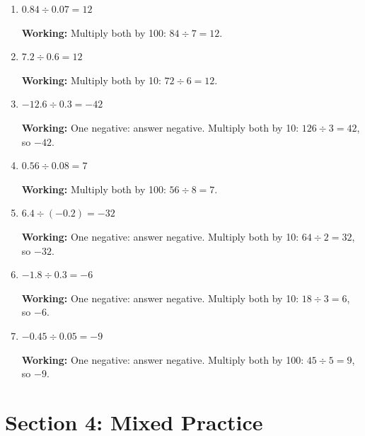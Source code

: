 \documentclass[12pt,a4paper]{article}
\begin{document}
\begin{enumerate}
    \textbf{Working:} Multiply both by 10: $36 \div 6 = 6$.
    
    \item $0.84 \div 0.07 = 12$
    
    \textbf{Working:} Multiply both by 100: $84 \div 7 = 12$.
    
    \item $7.2 \div 0.6 = 12$
    
    \textbf{Working:} Multiply both by 10: $72 \div 6 = 12$.
    
    \item $-12.6 \div 0.3 = -42$
    
    \textbf{Working:} One negative: answer negative.
    Multiply both by 10: $126 \div 3 = 42$, so $-42$.
    
    \item $0.56 \div 0.08 = 7$
    
    \textbf{Working:} Multiply both by 100: $56 \div 8 = 7$.
    
    \item $6.4 \div (-0.2) = -32$
    
    \textbf{Working:} One negative: answer negative.
    Multiply both by 10: $64 \div 2 = 32$, so $-32$.
    
    \item $-1.8 \div 0.3 = -6$
    
    \textbf{Working:} One negative: answer negative.
    Multiply both by 10: $18 \div 3 = 6$, so $-6$.
    
    \item $-0.45 \div 0.05 = -9$
    
    \textbf{Working:} One negative: answer negative.
    Multiply both by 100: $45 \div 5 = 9$, so $-9$.
\end{enumerate}

\section*{Section 4: Mixed Practice}
\end{document}
